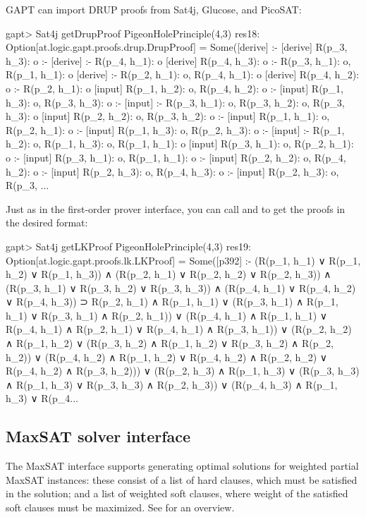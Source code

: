 \documentclass[a4paper,11pt]{article}
\newcommand{\cli}[1]{{\ttfamily {#1}}}
\begin{document}
GAPT can import DRUP proofs from Sat4j, Glucose, and PicoSAT:
\begin{clilisting}
gapt> Sat4j getDrupProof PigeonHolePrinciple(4,3)
res18: Option[at.logic.gapt.proofs.drup.DrupProof] =
Some([derive]  :-
[derive] R(p_3, h_3): o :-
[derive]  :- R(p_4, h_1): o
[derive] R(p_4, h_3): o :- R(p_3, h_1): o, R(p_1, h_1): o
[derive]  :- R(p_2, h_1): o, R(p_4, h_1): o
[derive] R(p_4, h_2): o :- R(p_2, h_1): o
[input] R(p_1, h_2): o, R(p_4, h_2): o :-
[input] R(p_1, h_3): o, R(p_3, h_3): o :-
[input]  :- R(p_3, h_1): o, R(p_3, h_2): o, R(p_3, h_3): o
[input] R(p_2, h_2): o, R(p_3, h_2): o :-
[input] R(p_1, h_1): o, R(p_2, h_1): o :-
[input] R(p_1, h_3): o, R(p_2, h_3): o :-
[input]  :- R(p_1, h_2): o, R(p_1, h_3): o, R(p_1, h_1): o
[input] R(p_3, h_1): o, R(p_2, h_1): o :-
[input] R(p_3, h_1): o, R(p_1, h_1): o :-
[input] R(p_2, h_2): o, R(p_4, h_2): o :-
[input] R(p_2, h_3): o, R(p_4, h_3): o :-
[input] R(p_2, h_3): o, R(p_3, ...
\end{clilisting}

Just as in the first-order prover interface, you can call
\cli{getRobinsonProof} and \cli{getLKProof} to get the proofs in the desired
format:
\begin{clilisting}
gapt> Sat4j getLKProof PigeonHolePrinciple(4,3)
res19: Option[at.logic.gapt.proofs.lk.LKProof] =
Some([p392]
:-
(R(p_1, h_1) ∨ R(p_1, h_2) ∨ R(p_1, h_3)) ∧
    (R(p_2, h_1) ∨ R(p_2, h_2) ∨ R(p_2, h_3)) ∧
    (R(p_3, h_1) ∨ R(p_3, h_2) ∨ R(p_3, h_3)) ∧
    (R(p_4, h_1) ∨ R(p_4, h_2) ∨ R(p_4, h_3)) ⊃
  R(p_2, h_1) ∧ R(p_1, h_1) ∨
    (R(p_3, h_1) ∧ R(p_1, h_1) ∨ R(p_3, h_1) ∧ R(p_2, h_1)) ∨
    (R(p_4, h_1) ∧ R(p_1, h_1) ∨
      R(p_4, h_1) ∧ R(p_2, h_1) ∨
      R(p_4, h_1) ∧ R(p_3, h_1)) ∨
    (R(p_2, h_2) ∧ R(p_1, h_2) ∨
      (R(p_3, h_2) ∧ R(p_1, h_2) ∨ R(p_3, h_2) ∧ R(p_2, h_2)) ∨
      (R(p_4, h_2) ∧ R(p_1, h_2) ∨
        R(p_4, h_2) ∧ R(p_2, h_2) ∨
        R(p_4, h_2) ∧ R(p_3, h_2))) ∨
    (R(p_2, h_3) ∧ R(p_1, h_3) ∨
      (R(p_3, h_3) ∧ R(p_1, h_3) ∨ R(p_3, h_3) ∧ R(p_2, h_3)) ∨
      (R(p_4, h_3) ∧ R(p_1, h_3) ∨
        R(p_4...
\end{clilisting}

\subsection{MaxSAT solver interface}

The MaxSAT interface supports generating optimal solutions for weighted partial
MaxSAT instances: these consist of a list of hard clauses, which must be
satisfied in the solution; and a list of weighted soft clauses, where weight of
the satisfied soft clauses must be maximized.  See \cite{Argelich2008First}
for an overview.
\end{document}
